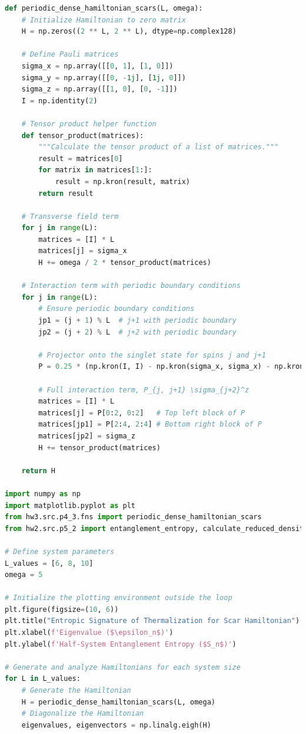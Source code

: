 \documentclass[12pt]{article}
\begin{document}
\begin{lstlisting}[language=Python]
def periodic_dense_hamiltonian_scars(L, omega):
    # Initialize Hamiltonian to zero matrix
    H = np.zeros((2 ** L, 2 ** L), dtype=np.complex128)

    # Define Pauli matrices
    sigma_x = np.array([[0, 1], [1, 0]])
    sigma_y = np.array([[0, -1j], [1j, 0]])
    sigma_z = np.array([[1, 0], [0, -1]])
    I = np.identity(2)

    # Tensor product helper function
    def tensor_product(matrices):
        """Calculate the tensor product of a list of matrices."""
        result = matrices[0]
        for matrix in matrices[1:]:
            result = np.kron(result, matrix)
        return result

    # Transverse field term
    for j in range(L):
        matrices = [I] * L
        matrices[j] = sigma_x
        H += omega / 2 * tensor_product(matrices)

    # Interaction term with periodic boundary conditions
    for j in range(L):
        # Ensure periodic boundary conditions
        jp1 = (j + 1) % L  # j+1 with periodic boundary
        jp2 = (j + 2) % L  # j+2 with periodic boundary

        # Projector onto the singlet state for spins j and j+1
        P = 0.25 * (np.kron(I, I) - np.kron(sigma_x, sigma_x) - np.kron(sigma_y, sigma_y) - np.kron(sigma_z, sigma_z))

        # Full interaction term, P_{j, j+1} \sigma_{j+2}^z
        matrices = [I] * L
        matrices[j] = P[0:2, 0:2]   # Top left block of P
        matrices[jp1] = P[2:4, 2:4] # Bottom right block of P
        matrices[jp2] = sigma_z
        H += tensor_product(matrices)

    return H

import numpy as np
import matplotlib.pyplot as plt
from hw3.src.p4_3.fns import periodic_dense_hamiltonian_scars
from hw2.src.p5_2 import entanglement_entropy, calculate_reduced_density_matrix

# Define system parameters
L_values = [6, 8, 10]
omega = 5

# Initialize the plotting environment outside the loop
plt.figure(figsize=(10, 6))
plt.title("Entropic Signature of Thermalization for Scar Hamiltonian")
plt.xlabel(f'Eigenvalue ($\epsilon_n$)')
plt.ylabel(f'Half-System Entanglement Entropy ($S_n$)')

# Generate and analyze Hamiltonians for each system size
for L in L_values:
    # Generate the Hamiltonian
    H = periodic_dense_hamiltonian_scars(L, omega)
    # Diagonalize the Hamiltonian
    eigenvalues, eigenvectors = np.linalg.eigh(H)


\end{lstlisting}
\end{document}
